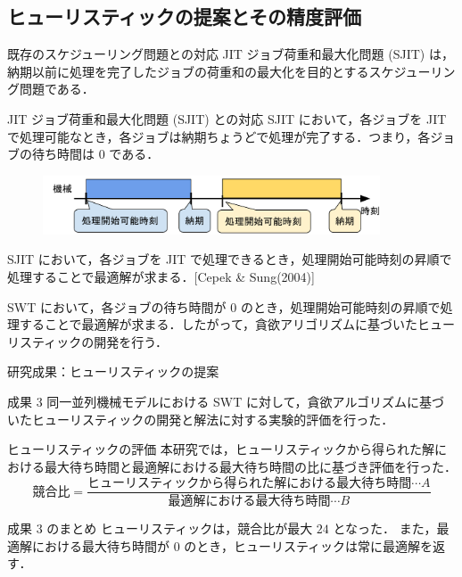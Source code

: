 \documentclass[dvipdfmx]{beamer}
\begin{document}
    \subsection{ヒューリスティックの提案とその精度評価}
    \begin{frame}{既存のスケジューリング問題との対応}
      JIT ジョブ荷重和最大化問題 (SJIT) は，納期以前に処理を完了したジョブの荷重和の最大化を目的とするスケジューリング問題である．
      \begin{block}{JIT ジョブ荷重和最大化問題 (SJIT) との対応}
        SJIT において，各ジョブを JIT で処理可能なとき，各ジョブは納期ちょうどで処理が完了する．つまり，各ジョブの待ち時間は $0$ である．
        \vspace{-2mm}
        \begin{figure}[h]
          \centering
          \includegraphics[width=10cm]{figure/SJIT1.pdf}
        \end{figure}
        \vspace{-2mm}
        SJIT において，各ジョブを JIT で処理できるとき，処理開始可能時刻の昇順で処理することで最適解が求まる．[Cepek \& Sung(2004)]
      \end{block}
      \begin{block}{}
        SWT において，各ジョブの待ち時間が $0$ のとき，処理開始可能時刻の昇順で処理することで最適解が求まる．したがって，貪欲アリゴリズムに基づいたヒューリスティックの開発を行う．
      \end{block}
    \end{frame}

    \begin{frame}{研究成果：ヒューリスティックの提案}
      \begin{alertblock}{成果 3}
        同一並列機械モデルにおける SWT に対して，貪欲アルゴリズムに基づいたヒューリスティックの開発と解法に対する実験的評価を行った．
      \end{alertblock}
      \begin{block}{ヒューリスティックの評価}
        本研究では，ヒューリスティックから得られた解における最大待ち時間と最適解における最大待ち時間の比に基づき評価を行った．
        $${\displaystyle \text{競合比} = \frac{\text{ヒューリスティックから得られた解における最大待ち時間}\cdots A}{\text{最適解における最大待ち時間}\cdots B}}$$
      \end{block}
      \begin{alertblock}{成果 3 のまとめ}
        ヒューリスティックは，競合比が最大 $24$ となった．
        また，最適解における最大待ち時間が $0$ のとき，ヒューリスティックは常に最適解を返す．
      \end{alertblock}
    \end{frame}
\end{document}
